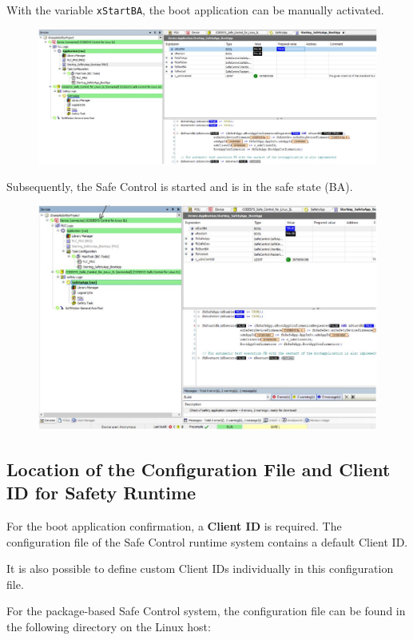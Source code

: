 \documentclass[a4paper,12pt]{article}
\begin{document}
\newpage
With the variable \texttt{xStartBA}, the boot application can be manually activated.
\begin{figure}[H]
	\centering
	\includegraphics[width=1\textwidth]{e25.JPG}
\end{figure}
Subsequently, the Safe Control is started and is in the safe state (BA).
\begin{figure}[H]
	\centering
	\includegraphics[width=1\textwidth]{e26.JPG}
\end{figure}


\subsection{Location of the Configuration File and Client ID for Safety Runtime}

For the boot application confirmation, a \textbf{Client ID} is required. The configuration file of the Safe Control runtime system contains a default Client ID.

It is also possible to define custom Client IDs individually in this configuration file.

For the package-based Safe Control system, the configuration file can be found in the following directory on the Linux host:
\end{document}
